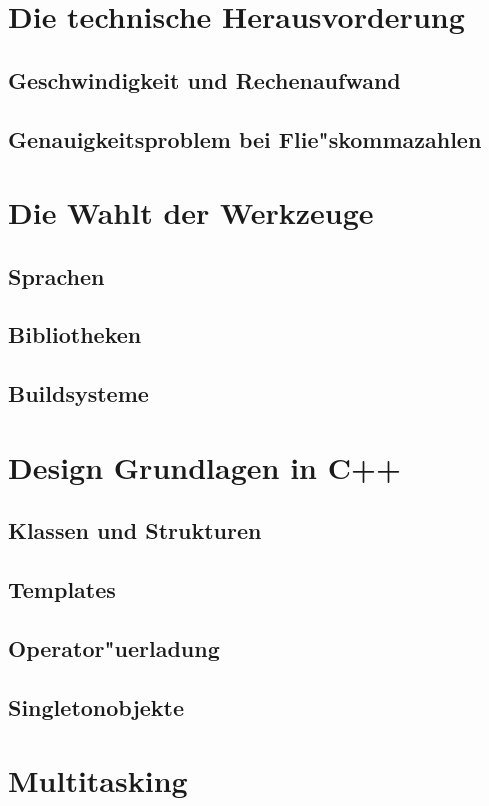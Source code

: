 \documentclass[14pt, a4paper]{report}
\begin{document}
\chapter{Die technische Herausvorderung}
\section{Geschwindigkeit und Rechenaufwand}
\section{Genauigkeitsproblem bei Flie"skommazahlen}

\chapter{Die Wahlt der Werkzeuge}
\section{Sprachen}
\section{Bibliotheken}
\section{Buildsysteme}

\chapter{Design Grundlagen in C++}
\section{Klassen und Strukturen}
\section{Templates}
\section{Operator"uerladung}
\section{Singletonobjekte}

\chapter{Multitasking}
\end{document}
